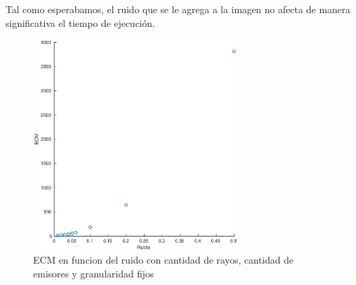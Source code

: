 \par Tal como esperabamos, el ruido que se le agrega a la imagen no afecta de manera significativa el tiempo de ejecuci\'on.

\begin{figure}[H]
	\centering	\includegraphics[width=0.7\textwidth]{img/ruido_ecm}
	\caption{ECM en funcion del ruido con cantidad de rayos, cantidad de emisores y granularidad fijos}
	\label{fig:ruido_ecm}
\end{figure}

